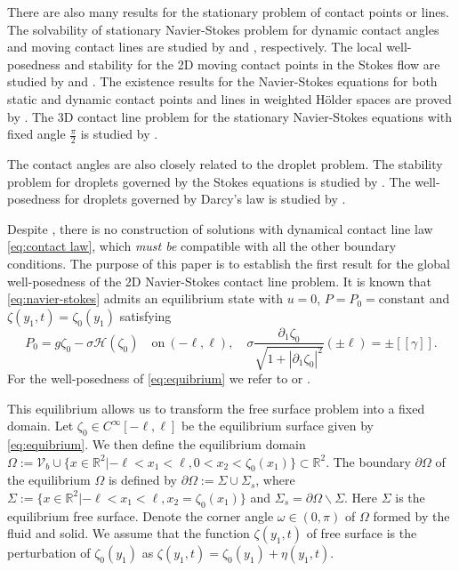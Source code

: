 \documentclass[letterpaper,reqno,10pt,twoside]{amsart}
\theoremstyle{definition}
\theoremstyle{remark}
\def\p{\partial}
\def\Om{\Omega}
\def\om{\omega}
\begin{document}
	There are also many results for the stationary problem of contact points or lines. The solvability of stationary Navier-Stokes problem for dynamic contact angles and moving contact lines are studied by \cite[Kr\"oner]{Kr87} and \cite[Socolosky]{Soco93}, respectively. The local well-posedness and stability for the 2D moving contact points in the Stokes flow are studied by \cite[Guo-Tice]{GT18} and \cite[Tice-Zheng]{ZhT17}. The existence results for the Navier-Stokes equations for both static and dynamic contact points and lines in weighted H\"older spaces are proved by \cite[Solonnikov]{Sol95, Sol98}. The 3D contact line problem for the stationary Navier-Stokes equations with fixed angle $\frac{\pi}{2}$ is studied by \cite[Jin]{Jin05}.
	
	The contact angles are also closely related to the droplet problem. The stability problem for droplets governed by the Stokes equations is studied by \cite[Tice-Wu]{TW21}. The well-posedness for droplets governed by Darcy's law is studied by \cite[Kn\"upfer-Masmoudi]{KM15}.
	
	Despite  \cite[Guo-Tice]{GT2020}, there is no construction of solutions with dynamical contact line law \eqref{eq:contact law}, which \textit{must be} compatible with all the other boundary conditions. The purpose of this paper is to establish the first result for the global well-posedness of the 2D Navier-Stokes contact line problem. It is known that \eqref{eq:navier-stokes} admits an equilibrium state with $u=0$, $P=P_0= \text{constant}$ and $\zeta(y_1,t)=\zeta_0(y_1)$ satisfying
	\begin{equation}\label{eq:equibrium}
		P_0=g\zeta_0-\sigma\mathcal{H}(\zeta_0)\quad  \text{on} \ (-\ell,\ell),\quad
		\sigma\frac{\p_1\zeta_0}{\sqrt{1+|\p_1\zeta_0|^2}}(\pm\ell)=\pm[\![\gamma]\!].
	\end{equation}
	For the well-posedness of \eqref{eq:equibrium} we refer to \cite[Guo-Tice]{GT18} or \cite[Finn]{Finn}.
	
	This equilibrium allows us to transform the free surface problem into a fixed domain. Let $\zeta_0\in C^\infty[-\ell,\ell]$ be the equilibrium surface given by \eqref{eq:equibrium}. We then define the equilibrium domain
	$
	\Om:=\mathcal{V}_{b}\cup\big\{x\in\mathbb{R}^2|-\ell<x_1<\ell, 0<x_2<\zeta_0(x_1)\big\} \subset\mathbb{R}^2
	$.
	The boundary $\p\Om$ of the equilibrium $\Om$ is defined by
	$
	\p\Om:=\Sigma\cup\Sigma_s$,
	where
	$
	\Sigma:=\{x\in\mathbb{R}^2|-\ell<x_1<\ell, x_2=\zeta_0(x_1)\}$ and $ \Sigma_s=\p\Om\backslash \Sigma$.
	Here $\Sigma$ is the equilibrium free surface. Denote the corner angle $\om\in(0,\pi)$ of $\Om$ formed by the fluid and solid.
	We assume that the function $\zeta(y_1,t)$ of free surface is the perturbation of $\zeta_0(y_1)$ as
	$
	\zeta(y_1,t)=\zeta_0(y_1)+\eta(y_1,t)$.
	
\end{document}
